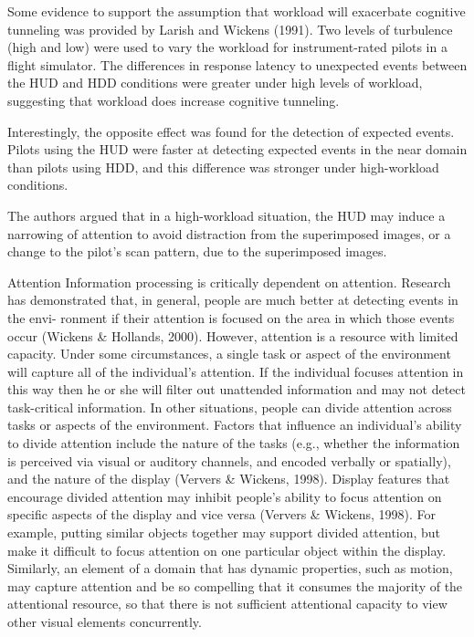 \documentclass[utf8,bachelor,manualbib]{gradu3}
\begin{document}
Some evidence to support the assumption that workload will exacerbate cognitive
tunneling was provided by Larish and Wickens (1991). Two levels of turbulence
(high and low) were used to vary the workload for instrument-rated
pilots in a flight simulator. The differences in response latency to unexpected
events between the HUD and HDD conditions were greater under high levels of
workload, suggesting that workload does increase cognitive tunneling. 

Interestingly,
the opposite effect was found for the detection of expected events. Pilots
using the HUD were faster at detecting expected events in the near domain than
pilots using HDD, and this difference was stronger under high-workload conditions.

The authors argued that in a high-workload situation, the HUD may induce
a narrowing of attention to avoid distraction from the superimposed
images, or a change to the pilot’s scan pattern, due to the superimposed images.

Attention
Information processing is critically dependent on attention. Research has demonstrated
that, in general, people are much better at detecting events in the envi-
ronment if their attention is focused on the area in which those events occur
(Wickens \& Hollands, 2000). However, attention is a resource with limited capacity.
Under some circumstances, a single task or aspect of the environment
will capture all of the individual’s attention. If the individual focuses attention in
this way then he or she will filter out unattended information and may not detect
task-critical information. In other situations, people can divide attention across
tasks or aspects of the environment. Factors that influence an individual’s ability
to divide attention include the nature of the tasks (e.g., whether the information
is perceived via visual or auditory channels, and encoded verbally or spatially),
and the nature of the display (Ververs \& Wickens, 1998).
Display features that encourage divided attention may inhibit people’s ability to
focus attention on specific aspects of the display and vice versa (Ververs \&
Wickens, 1998). For example, putting similar objects together may support divided
attention, but make it difficult to focus attention on one particular object
within the display. Similarly, an element of a domain that has dynamic properties,
such as motion, may capture attention and be so compelling that it consumes the
majority of the attentional resource, so that there is not sufficient attentional capacity
to view other visual elements concurrently. \citep{crawford2006}
\end{document}
